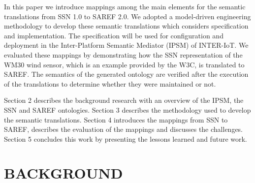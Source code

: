 \documentclass{sig-alternate-05-2015}
\begin{document}
In this paper we introduce mappings among the main elements for the semantic translations from SSN 1.0 to SAREF 2.0. We adopted a model-driven engineering methodology to develop these semantic translations which considers specification and implementation. The specification will be used for configuration and deployment in the Inter-Platform Semantic Mediator (IPSM) of INTER-IoT. We evaluated these mappings by demonstrating how the SSN representation of the WM30 wind sensor, which is an example provided by the W3C, is translated to SAREF. The semantics of the generated ontology are verified after the execution of the translations to determine whether they were maintained or not. 

Section 2 describes the background research with an overview of the IPSM, the SSN and SAREF ontologies. Section 3 describes the methodology used to develop the semantic translations. Section 4 introduces the mappings from SSN to SAREF, describes the evaluation of the mappings and discusses the challenges. Section 5 concludes this work by presenting the lessons learned and future work. 


\section{BACKGROUND}
\end{document}
